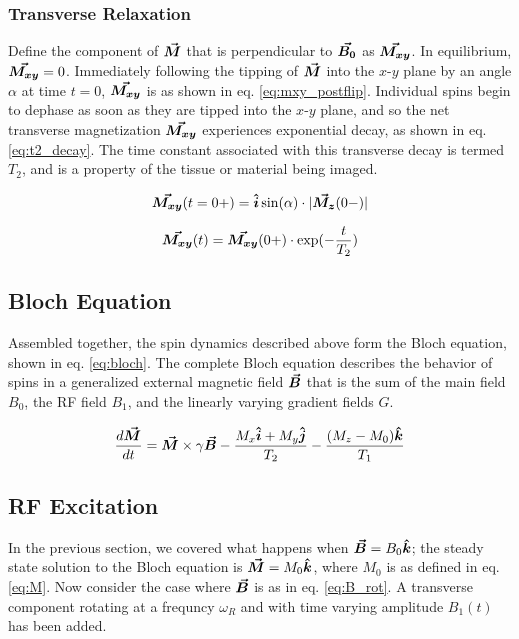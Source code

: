 \subsubsection{Transverse Relaxation}
Define the component of $\bm{\vec{M}}$ that is perpendicular to $\bm{\vec{B_0}}$ as $\bm{\vec{M_{xy}}}$. In equilibrium,
$\bm{\vec{M_{xy}}} = 0$.  Immediately following the tipping of $\bm{\vec{M}}$ into the $x$-$y$ plane by an angle $\alpha$ at
time $t=0$, $\bm{\vec{M_{xy}}}$ is as shown in eq. \ref{eq:mxy_postflip}. Individual spins begin to dephase as soon as they
are tipped into the $x$-$y$ plane, and so the net transverse magnetization $\bm{\vec{M_{xy}}}$ experiences exponential
decay, as shown in eq. \ref{eq:t2_decay}. The time constant associated with this transverse decay is termed $T_2$, and
is a property of the tissue or material being imaged.

\begin{equation}\label{eq:mxy_postflip}
    \bm{\vec{M_{xy}}}(t=0+) = \bm{\hat{i}}\sin(\alpha) \cdot |\bm{\vec{M_z}}(0-)|
\end{equation}

\begin{equation}\label{eq:t2_decay}
    \bm{\vec{M_{xy}}}(t) = \bm{\vec{M_{xy}}}(0+) \cdot \exp(-\frac{t}{T_2})
\end{equation}

\subsection{Bloch Equation}
Assembled together, the spin dynamics described above form the Bloch equation, shown in eq. \ref{eq:bloch}. The complete
Bloch equation describes the behavior of spins in a generalized external magnetic field $\bm{\vec{B}}$ that is the sum of
the main field $B_0$, the RF field $B_1$, and the linearly varying gradient fields $G$. 

\begin{equation}\label{eq:bloch}
    \frac{d \bm{\vec{M}}}{dt} = \bm{\vec{M}} \times \gamma \bm{\vec{B}} - \frac{M_x \bm{\hat{i}} + M_y \bm{\hat{j}}}{T_2} - \frac{(M_z - M_0)
    \bm{\hat{k}}}{T_1}
\end{equation}

\subsection{RF Excitation}
In the previous section, we covered what happens when $\bm{\vec{B}} = B_0 \bm{\hat{k}}$; the steady state solution to the Bloch
equation is $\bm{\vec{M}} = M_0 \bm{\hat{k}}$, where $M_0$ is as defined in eq. \ref{eq:M}.  Now consider the case where
$\bm{\vec{B}}$ is as in eq. \ref{eq:B_rot}. A transverse component rotating at a frequncy $\omega_R$ and with time varying
amplitude $B_1(t)$ has been added. 


